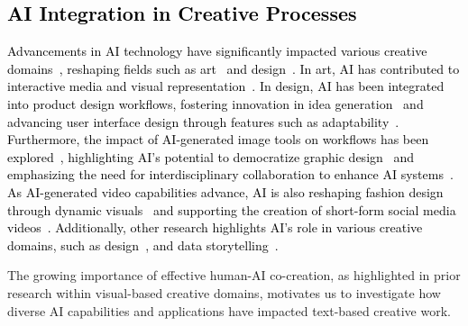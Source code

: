 \subsection{\textcolor{black}{AI Integration in Creative Processes}}

\textcolor{black}{Advancements in AI technology have significantly impacted various creative domains~\cite{anantrasirichai2022artificial, 10.1145/3613904.3642726}, reshaping fields such as art~\cite{cetinic2022understanding} and design~\cite{lee2023impact}. In art, AI has contributed to interactive media and visual representation~\cite{anadol2018archive, sun2023ai, tang2023ai}. In design, AI has been integrated into product design workflows, fostering innovation in idea generation~\cite{hong2023generative, chiou2023designing} and advancing user interface design through features such as adaptability~\cite{cheng2023play, zhang2023layoutdiffusion}. Furthermore, the impact of AI-generated image tools on workflows has been explored~\cite{mustafa2023impact, tang2024s}, highlighting AI’s potential to democratize graphic design~\cite{tang2024exploring} and emphasizing the need for interdisciplinary collaboration to enhance AI systems~\cite{meron2022graphic}. As AI-generated video capabilities advance, AI is also reshaping fashion design through dynamic visuals~\cite{liu2019toward, karras2023dreampose} and supporting the creation of short-form social media videos~\cite{10.1145/3613904.3642476}. Additionally, other research highlights AI's role in various creative domains, such as design~\cite{10.1145/3613904.3642812}, and data storytelling~\cite{10.1145/3613904.3642726}.}


The growing importance of effective human-AI co-creation, as highlighted in prior research within visual-based creative domains, motivates us to investigate how diverse AI capabilities and applications have impacted text-based creative work.




